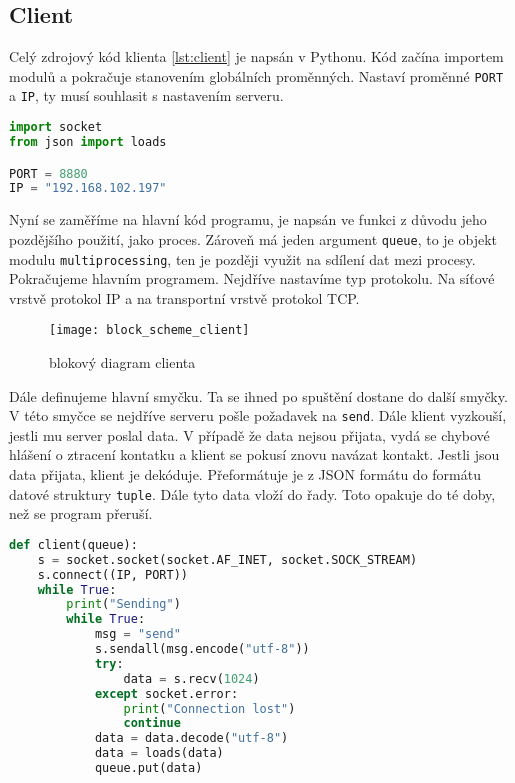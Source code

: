 \documentclass[12pt]{report}			%
\begin{document}
\subsection{Client}

Celý zdrojový kód klienta \ref{lst:client} je napsán v Pythonu. Kód začína importem modulů a pokračuje stanovením globálních proměnných. Nastaví proměnné \texttt{PORT} a \texttt{IP}, ty musí souhlasit s nastavením serveru. 
\begin{lstlisting}[title={Program client.py}, caption={client.py}, language=Python]
import socket
from json import loads

PORT = 8880
IP = "192.168.102.197"
\end{lstlisting}

Nyní se zaměříme na hlavní kód programu, je napsán ve funkci z důvodu jeho pozdějšího použití, jako proces. Zároveň má jeden argument \texttt{queue}, to je objekt modulu \texttt{multiprocessing}, ten je později využit na sdílení dat mezi procesy. Pokračujeme hlavním programem. Nejdříve nastavíme typ protokolu. Na síťové vrstvě protokol IP a na transportní vrstvě protokol TCP. 


\begin{figure}[h]
\caption{blokový diagram clienta}
\centering
 \texttt{[image: block\_scheme\_client]}
\end{figure}

Dále definujeme hlavní smyčku. Ta se ihned po spuštění dostane do další smyčky. V této smyčce se nejdříve serveru pošle požadavek na \texttt{send}. Dále klient vyzkouší, jestli mu server poslal data. V případě že data nejsou přijata, vydá se chybové hlášení o ztracení kontatku a klient se pokusí znovu navázat kontakt. Jestli jsou data přijata, klient je dekóduje. Přeformátuje je z JSON formátu do formátu datové struktury \texttt{tuple}. Dále tyto data vloží do řady. Toto opakuje do té doby, než se program přeruší. 

\begin{lstlisting}[title={Program client.py}, caption={client.py}, language=Python]
def client(queue):
    s = socket.socket(socket.AF_INET, socket.SOCK_STREAM)
    s.connect((IP, PORT))
    while True:
        print("Sending")
        while True:
            msg = "send"
            s.sendall(msg.encode("utf-8"))
            try:
                data = s.recv(1024)
            except socket.error:
                print("Connection lost")
                continue
            data = data.decode("utf-8")
            data = loads(data)
            queue.put(data)

\end{lstlisting}
\end{document}
